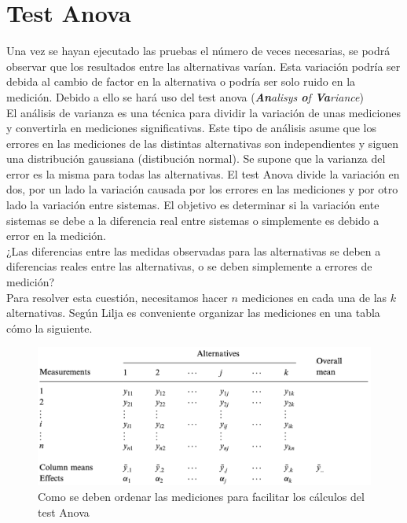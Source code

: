 \section{Test Anova}
Una vez se hayan ejecutado las pruebas el número de veces necesarias, se podrá observar que los resultados entre las alternativas varían. Esta variación podría ser debida al cambio de factor en la alternativa o podría ser solo ruido en la medición. Debido a ello se hará uso del test anova (\textit{\textbf{An}alisys \textbf{o}f \textbf{Va}riance})\\

El análisis de varianza es una técnica para dividir la variación de unas mediciones y convertirla en mediciones significativas. Este tipo de análisis asume que los errores en las mediciones de las distintas alternativas son independientes y siguen una distribución gaussiana (distibución normal). Se supone que la varianza del error es la misma para todas las alternativas. El test Anova divide la variación en dos, por un lado la variación causada por los errores en las mediciones y por otro lado la variación entre sistemas. El objetivo es determinar si la variación ente sistemas se debe a la diferencia real entre sistemas o simplemente es debido a error en la medición. \cite{lilja_2000} \\

¿Las diferencias entre las medidas observadas para las alternativas se deben a diferencias reales entre las alternativas, o se deben simplemente a errores de medición? \cite{lilja_2000} \\

Para resolver esta cuestión, necesitamos hacer $n$ mediciones en cada una de las $k$ alternativas. Según Lilja \cite{lilja_2000} es conveniente organizar las mediciones en una tabla cómo la siguiente. 
 
\begin{figure}[H]
    \centering
    \includegraphics[scale=0.6]{doc/assets/images/Capitulo3/lilja_recommend.png}
    \caption{Como se deben ordenar las mediciones para facilitar los cálculos del test Anova \cite{lilja_2000}}
    \label{fig:Anova_liljal}
\end{figure}

